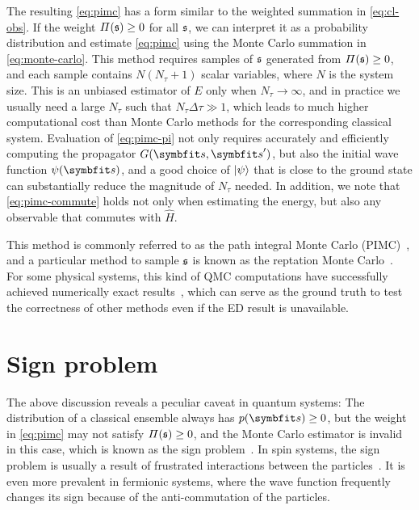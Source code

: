 The resulting \cref{eq:pimc} has a form similar to the weighted summation in \cref{eq:cl-obs}. If the weight $\varPi(\mathfrak{s}) \ge 0$ for all $\mathfrak{s}$, we can interpret it as a probability distribution and estimate \cref{eq:pimc} using the Monte Carlo summation in \cref{eq:monte-carlo}. This method requires samples of $\mathfrak{s}$ generated from $\varPi(\mathfrak{s}) \ge 0$, and each sample contains $N (N_\tau + 1)$ scalar variables, where $N$ is the system size. This is an unbiased estimator of $E$ only when $N_\tau \to \infty$, and in practice we usually need a large $N_\tau$ such that $N_\tau \Delta \tau \gg 1$, which leads to much higher computational cost than Monte Carlo methods for the corresponding classical system. Evaluation of \cref{eq:pimc-pi} not only requires accurately and efficiently computing the propagator $G(\vs, \vs')$, but also the initial wave function $\psi(\vs)$, and a good choice of $\ket{\psi}$ that is close to the ground state can substantially reduce the magnitude of $N_\tau$ needed. In addition, we note that \cref{eq:pimc-commute} holds not only when estimating the energy, but also any observable that commutes with $\hat{H}$.

This method is commonly referred to as the path integral Monte Carlo (PIMC)~\cite{barker1979quantum, raedt1985monte}, and a particular method to sample $\mathfrak{s}$ is known as the reptation Monte Carlo~\cite{baroni1999reptation}. For some physical systems, this kind of QMC computations have successfully achieved numerically exact results~\cite{sandvik1997finite, todo2001cluster}, which can serve as the ground truth to test the correctness of other methods even if the ED result is unavailable.

\section{Sign problem}
\label{sec:sign-problem}

The above discussion reveals a peculiar caveat in quantum systems: The distribution of a classical ensemble always has $p(\vs) \ge 0$, but the weight in \cref{eq:pimc} may not satisfy $\varPi(\mathfrak{s}) \ge 0$, and the Monte Carlo estimator is invalid in this case, which is known as the sign problem~\cite{loh1990sign}. In spin systems, the sign problem is usually a result of frustrated interactions between the particles~\cite{henelius2000sign}. It is even more prevalent in fermionic systems, where the wave function frequently changes its sign because of the anti-commutation of the particles.

